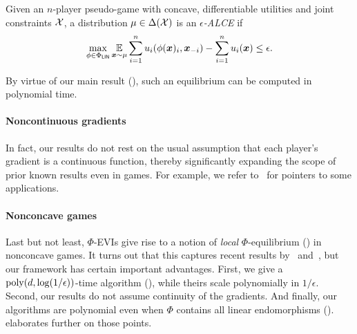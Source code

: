 \begin{definition}
    Given an $n$-player pseudo-game with concave, differentiable utilities and joint constraints ${\mathcal{X}}$, a distribution $\mu \in \Delta({\mathcal{X}})$ is an \emph{$\epsilon$-ALCE} if
    \begin{equation*}
        \max_{\phi \in \Phi_\mathsf{LIN}} \operatorname*{\mathbb E}_{{\bm{x}} \sim \mu} \sum_{i=1}^n u_i(\phi({\bm{x}})_i, {\bm{x}}_{-i}) - \sum_{i=1}^n u_i({\bm{x}}) \leq \epsilon.
    \end{equation*}
\end{definition}

By virtue of our main result (), such an equilibrium can be computed in polynomial time.

\paragraph{Noncontinuous gradients} In fact, our results do not rest on the usual assumption that each player's gradient is a continuous function, thereby significantly expanding the scope of prior known results even in games. For example, we refer to~\citet{Dasgupta86:Existence,Bichler21:Learning,Martin24:Joint} for pointers to some applications.

\paragraph{Nonconcave games} Last but not least, $\Phi$-EVIs give rise to a notion of \emph{local} $\Phi$-equilibrium () in nonconcave games. It turns out that this captures recent results by~\citet{Cai24:Tractable} and~\citet{Ahunbay25:First}, but our framework has certain important advantages. First, we give a $\mathrm{poly}(d, \log(1/\epsilon))$-time algorithm (), while theirs scale polynomially in $1/\epsilon$. Second, our results do not assume continuity of the gradients. And finally, our algorithms are polynomial even when $\Phi$ contains all linear endomorphisms ().  elaborates further on those points.